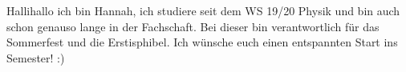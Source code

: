 \begin{multicols}{2}
{
Hallihallo ich bin Hannah, ich studiere seit dem WS 19/20 Physik und bin auch schon genauso lange in der Fachschaft. 
Bei dieser bin verantwortlich für das Sommerfest und die Erstisphibel. Ich wünsche euch einen entspannten Start ins Semester! :)
}

\vspace{0.2cm}


\end{multicols}
